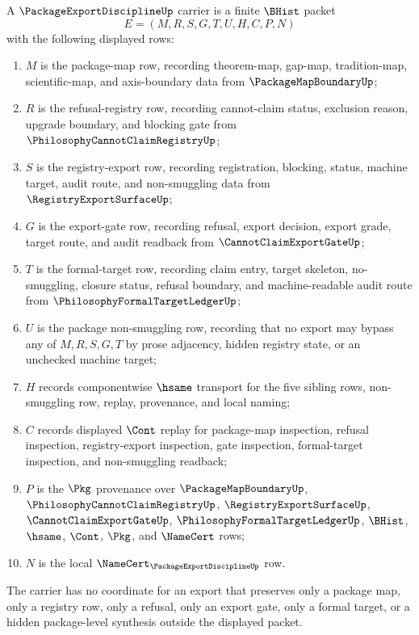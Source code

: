 \begin{definition}
\label{def:package-export-discipline-carrier}
A $\PackageExportDisciplineUp$ carrier is a finite $\BHist$ packet
$$
E=(M,R,S,G,T,U,H,C,P,N)
$$
with the following displayed rows:
\begin{enumerate}
\item $M$ is the package-map row, recording theorem-map, gap-map, tradition-map, scientific-map, and axis-boundary data from $\PackageMapBoundaryUp$;
\item $R$ is the refusal-registry row, recording cannot-claim status, exclusion reason, upgrade boundary, and blocking gate from $\PhilosophyCannotClaimRegistryUp$;
\item $S$ is the registry-export row, recording registration, blocking, status, machine target, audit route, and non-smuggling data from $\RegistryExportSurfaceUp$;
\item $G$ is the export-gate row, recording refusal, export decision, export grade, target route, and audit readback from $\CannotClaimExportGateUp$;
\item $T$ is the formal-target row, recording claim entry, target skeleton, no-smuggling, closure status, refusal boundary, and machine-readable audit route from $\PhilosophyFormalTargetLedgerUp$;
\item $U$ is the package non-smuggling row, recording that no export may bypass any of $M,R,S,G,T$ by prose adjacency, hidden registry state, or an unchecked machine target;
\item $H$ records componentwise $\hsame$ transport for the five sibling rows, non-smuggling row, replay, provenance, and local naming;
\item $C$ records displayed $\Cont$ replay for package-map inspection, refusal inspection, registry-export inspection, gate inspection, formal-target inspection, and non-smuggling readback;
\item $P$ is the $\Pkg$ provenance over $\PackageMapBoundaryUp$, $\PhilosophyCannotClaimRegistryUp$, $\RegistryExportSurfaceUp$, $\CannotClaimExportGateUp$, $\PhilosophyFormalTargetLedgerUp$, $\BHist$, $\hsame$, $\Cont$, $\Pkg$, and $\NameCert$ rows;
\item $N$ is the local $\NameCert_{\PackageExportDisciplineUp}$ row.
\end{enumerate}
The carrier has no coordinate for an export that preserves only a package map, only a registry row, only a refusal, only an export gate, only a formal target, or a hidden package-level synthesis outside the displayed packet.
\end{definition}

